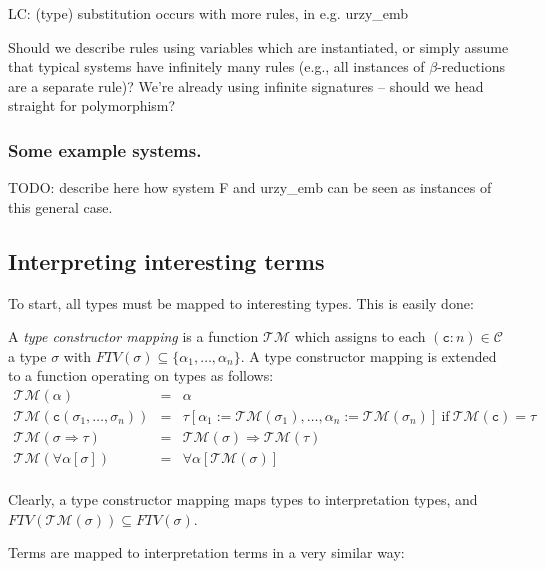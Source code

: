 \documentclass[runningheads,a4paper]{llncs}
\newcommand{\TypeConstructors}{\mathcal{C}}
\newcommand{\Typemap}{\mathcal{T\!M}}
\newcommand{\quant}[2]{\forall #1[#2]}
\newcommand{\arrtype}{\Rightarrow}
\newcommand{\FTV}{\mathit{FTV}}
\newcommand{\con}{\mathtt{c}}
\begin{document}
LC: (type) substitution occurs with more rules, in e.g. urzy\_emb

Should we describe rules using variables which are instantiated, or
simply assume that typical systems have infinitely many rules (e.g.,
all instances of $\beta$-reductions are a separate rule)? We're
already using infinite signatures -- should we head straight for
polymorphism?

\subsubsection{Some example systems.}

TODO: describe here how system F and urzy\_emb can be seen as instances
of this general case.

\subsection{Interpreting interesting terms}

To start, all types must be mapped to interesting types.  This is
easily done:

\begin{definition}
A \emph{type constructor mapping} is a function $\Typemap$ which assigns
to each $(\con:n) \in \TypeConstructors$ a type $\sigma$ with
$\FTV(\sigma) \subseteq \{ \alpha_1,\dots,\alpha_n \}$.  A type
constructor mapping is extended to a function operating on types as
follows:
\[
\begin{array}{rcl}
\Typemap(\alpha) & = & \alpha \\
\Typemap(\con(\sigma_1,\dots,\sigma_n)) & = &
  \tau[\alpha_1:=\Typemap(\sigma_1),\dots,\alpha_n:=\Typemap(\sigma_n)]\ 
  \text{if}\ \Typemap(\con) = \tau \\
\Typemap(\sigma \arrtype \tau) & = & \Typemap(\sigma) \arrtype
  \Typemap(\tau) \\
\Typemap(\quant{\alpha}{\sigma}) & = & \quant{\alpha}{\Typemap(\sigma)} \\
\end{array}
\]
\end{definition}

Clearly, a type constructor mapping maps types to interpretation types,
and $\FTV(\Typemap(\sigma)) \subseteq \FTV(\sigma)$.

Terms are mapped to interpretation terms in a very similar way:
\end{document}
